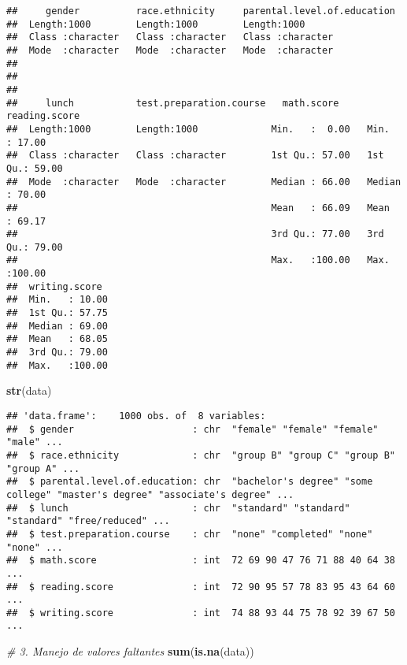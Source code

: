 \documentclass[
]{article}
\newenvironment{Shaded}{\begin{snugshade}}{\end{snugshade}}
\newcommand{\CommentTok}[1]{\textcolor[rgb]{0.56,0.35,0.01}{\textit{#1}}}
\newcommand{\FunctionTok}[1]{\textcolor[rgb]{0.13,0.29,0.53}{\textbf{#1}}}
\newcommand{\NormalTok}[1]{#1}
\begin{document}
\begin{verbatim}
##     gender          race.ethnicity     parental.level.of.education
##  Length:1000        Length:1000        Length:1000                
##  Class :character   Class :character   Class :character           
##  Mode  :character   Mode  :character   Mode  :character           
##                                                                   
##                                                                   
##                                                                   
##     lunch           test.preparation.course   math.score     reading.score   
##  Length:1000        Length:1000             Min.   :  0.00   Min.   : 17.00  
##  Class :character   Class :character        1st Qu.: 57.00   1st Qu.: 59.00  
##  Mode  :character   Mode  :character        Median : 66.00   Median : 70.00  
##                                             Mean   : 66.09   Mean   : 69.17  
##                                             3rd Qu.: 77.00   3rd Qu.: 79.00  
##                                             Max.   :100.00   Max.   :100.00  
##  writing.score   
##  Min.   : 10.00  
##  1st Qu.: 57.75  
##  Median : 69.00  
##  Mean   : 68.05  
##  3rd Qu.: 79.00  
##  Max.   :100.00
\end{verbatim}

\begin{Shaded}
\begin{Highlighting}[]
\FunctionTok{str}\NormalTok{(data)      }
\end{Highlighting}
\end{Shaded}

\begin{verbatim}
## 'data.frame':    1000 obs. of  8 variables:
##  $ gender                     : chr  "female" "female" "female" "male" ...
##  $ race.ethnicity             : chr  "group B" "group C" "group B" "group A" ...
##  $ parental.level.of.education: chr  "bachelor's degree" "some college" "master's degree" "associate's degree" ...
##  $ lunch                      : chr  "standard" "standard" "standard" "free/reduced" ...
##  $ test.preparation.course    : chr  "none" "completed" "none" "none" ...
##  $ math.score                 : int  72 69 90 47 76 71 88 40 64 38 ...
##  $ reading.score              : int  72 90 95 57 78 83 95 43 64 60 ...
##  $ writing.score              : int  74 88 93 44 75 78 92 39 67 50 ...
\end{verbatim}

\begin{Shaded}
\begin{Highlighting}[]
\CommentTok{\# 3. Manejo de valores faltantes }
\FunctionTok{sum}\NormalTok{(}\FunctionTok{is.na}\NormalTok{(data))  }
\end{Highlighting}
\end{Shaded}
\end{document}
